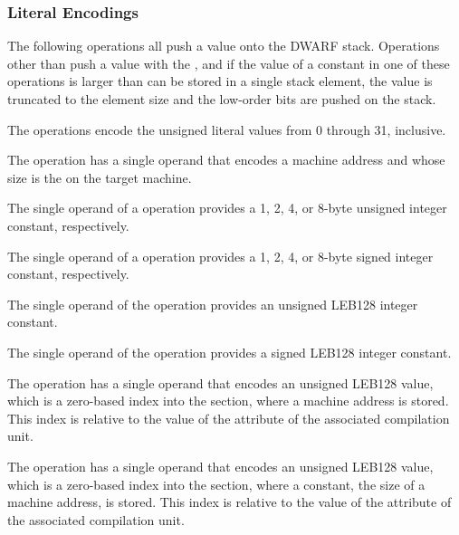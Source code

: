 \subsubsection{Literal Encodings}
\label{chap:literalencodings}
The 
following operations all push a value onto the DWARF
stack. 
Operations other than \DWOPconsttype{} push a value with the 
\specialaddresstype, and if the value of a constant in one of these 
operations is larger than can be stored in a single stack element, 
the value is truncated to the element size and the low-order bits
are pushed on the stack.
\begin{enumerate}[1. ]
\itembfnl{\DWOPlitzeroTARG, \DWOPlitoneTARG, \dots, \DWOPlitthirtyoneTARG}
The \DWOPlitnTARG{} operations encode the unsigned literal values
from 0 through 31, inclusive.

\itembfnl{\DWOPaddrTARG}
The \DWOPaddrNAME{} operation has a single operand that encodes
a machine address and whose size is the 
on the target machine.

\itembfnl{\DWOPconstoneuTARG, \DWOPconsttwouTARG, \DWOPconstfouruTARG, \DWOPconsteightuTARG}
\DWOPconstnxMARK{}
The single operand of a \DWOPconstnuNAME{} operation provides a 1,
2, 4, or 8-byte unsigned integer constant, respectively.

\itembfnl{\DWOPconstonesTARG, \DWOPconsttwosTARG, \DWOPconstfoursTARG, \DWOPconsteightsTARG}
The single operand of a \DWOPconstnsNAME{} operation provides a 1,
2, 4, or 8-byte signed integer constant, respectively.

\itembfnl{\DWOPconstuTARG}
The single operand of the \DWOPconstuNAME{} operation provides
an unsigned LEB128 integer constant.

\itembfnl{\DWOPconstsTARG}
The single operand of the \DWOPconstsNAME{} operation provides
a signed LEB128 integer constant.

\itembfnl{\DWOPaddrxTARG}
The \DWOPaddrxNAME{} operation has a single operand that
encodes an unsigned LEB128 value, 
which is a zero-based index into the \dotdebugaddr{} section, 
where a machine address is stored.
This index is relative to the value of the 
\DWATaddrbase{} attribute of the associated compilation unit.

\itembfnl{\DWOPconstxTARG}
The \DWOPconstxNAME{} operation has a single operand that
encodes an unsigned LEB128 value, 
which is a zero-based
index into the \dotdebugaddr{} section, where a constant, the
size of a machine address, is stored.
This index is relative to the value of the 
\DWATaddrbase{} attribute of the associated compilation unit.


\end{enumerate}
